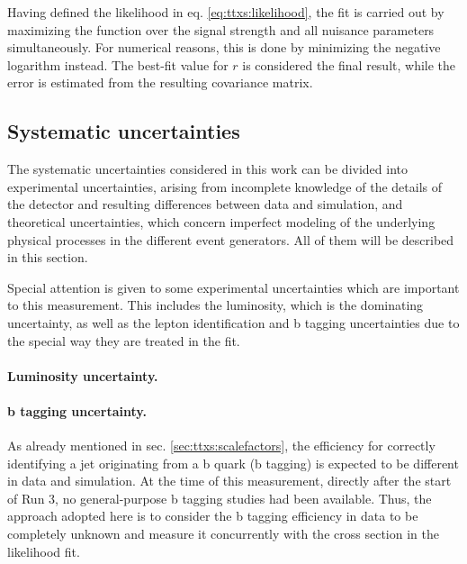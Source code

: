 Having defined the likelihood in eq. \ref{eq:ttxs:likelihood}, the fit is carried out by maximizing the function over the signal strength and all nuisance parameters simultaneously. For numerical reasons, this is done by minimizing the negative logarithm instead. The best-fit value for $r$ is considered the final result, while the error is estimated from the resulting covariance matrix. 

\subsection{Systematic uncertainties}
\label{sec:ttxs:systematics}


The systematic uncertainties considered in this work can be divided into experimental uncertainties, arising from incomplete knowledge of the details of the detector and resulting differences between data and simulation, and theoretical uncertainties, which concern imperfect modeling of the underlying physical processes in the different event generators. All of them will be described in this section.

Special attention is given to some experimental uncertainties which are important to this measurement. This includes the luminosity, which is the dominating uncertainty, as well as the lepton identification and b tagging uncertainties due to the special way they are treated in the fit.

\paragraph{Luminosity uncertainty.}


\paragraph{b tagging uncertainty.}

As already mentioned in sec. \ref{sec:ttxs:scalefactors}, the efficiency for correctly identifying a jet originating from a b quark (b tagging) is expected to be different in data and simulation. At the time of this measurement, directly after the start of Run 3, no general-purpose b tagging studies had been available. Thus, the approach adopted here is to consider the b tagging efficiency in data to be completely unknown and measure it concurrently with the cross section in the likelihood fit.

